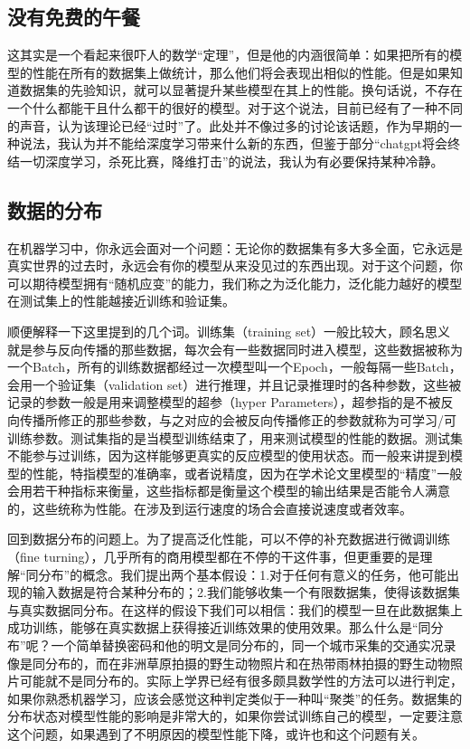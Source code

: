 \documentclass{article}
\begin{document}
\subsection{没有免费的午餐}
这其实是一个看起来很吓人的数学“定理”，但是他的内涵很简单：如果把所有的模型的性能在所有的数据集上做统计，那么他们将会表现出相似的性能。但是如果知道数据集的先验知识，就可以显著提升某些模型在其上的性能。换句话说，不存在一个什么都能干且什么都干的很好的模型。对于这个说法，目前已经有了一种不同的声音，认为该理论已经“过时”了。此处并不像过多的讨论该话题，作为早期的一种说法，我认为并不能给深度学习带来什么新的东西，但鉴于部分“chatgpt将会终结一切深度学习，杀死比赛，降维打击”的说法，我认为有必要保持某种冷静。

\subsection{数据的分布}
在机器学习中，你永远会面对一个问题：无论你的数据集有多大多全面，它永远是真实世界的过去时，永远会有你的模型从来没见过的东西出现。对于这个问题，你可以期待模型拥有“随机应变”的能力，我们称之为泛化能力，泛化能力越好的模型在测试集上的性能越接近训练和验证集。

顺便解释一下这里提到的几个词。训练集（training set）一般比较大，顾名思义就是参与反向传播的那些数据，每次会有一些数据同时进入模型，这些数据被称为一个Batch，所有的训练数据都经过一次模型叫一个Epoch，一般每隔一些Batch，会用一个验证集（validation set）进行推理，并且记录推理时的各种参数，这些被记录的参数一般是用来调整模型的超参（hyper Parameters），超参指的是不被反向传播所修正的那些参数，与之对应的会被反向传播修正的参数就称为可学习/可训练参数。测试集指的是当模型训练结束了，用来测试模型的性能的数据。测试集不能参与过训练，因为这样能够更真实的反应模型的使用状态。而一般来讲提到模型的性能，特指模型的准确率，或者说精度，因为在学术论文里模型的“精度”一般会用若干种指标来衡量，这些指标都是衡量这个模型的输出结果是否能令人满意的，这些统称为性能。在涉及到运行速度的场合会直接说速度或者效率。

回到数据分布的问题上。为了提高泛化性能，可以不停的补充数据进行微调训练（fine turning），几乎所有的商用模型都在不停的干这件事，但更重要的是理解“同分布”的概念。我们提出两个基本假设：1.对于任何有意义的任务，他可能出现的输入数据是符合某种分布的；2.我们能够收集一个有限数据集，使得该数据集与真实数据同分布。在这样的假设下我们可以相信：我们的模型一旦在此数据集上成功训练，能够在真实数据上获得接近训练效果的使用效果。那么什么是“同分布”呢？一个简单替换密码和他的明文是同分布的，同一个城市采集的交通实况录像是同分布的，而在非洲草原拍摄的野生动物照片和在热带雨林拍摄的野生动物照片可能就不是同分布的。实际上学界已经有很多颇具数学性的方法可以进行判定，如果你熟悉机器学习，应该会感觉这种判定类似于一种叫“聚类”的任务。数据集的分布状态对模型性能的影响是非常大的，如果你尝试训练自己的模型，一定要注意这个问题，如果遇到了不明原因的模型性能下降，或许也和这个问题有关。
\end{document}
